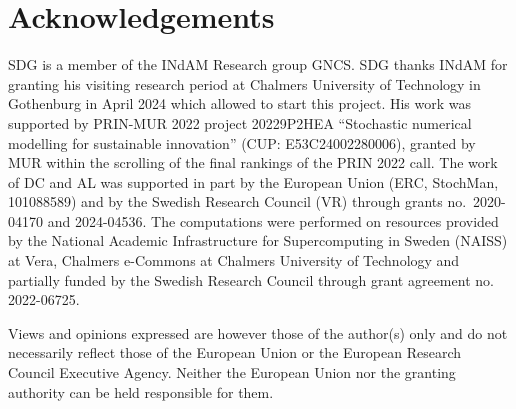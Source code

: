\documentclass[a4paper]{amsart}
\theoremstyle{remark}
\theoremstyle{definition}
\begin{document}
%



\section{Acknowledgements}

SDG is a member of the INdAM Research group GNCS. SDG thanks INdAM for granting his visiting research period at Chalmers University of Technology in Gothenburg in April 2024 which allowed to start this project. His work was supported by PRIN-MUR 2022 project 20229P2HEA ``Stochastic numerical modelling for sustainable innovation'' (CUP: E53C24002280006), granted by MUR
within the scrolling of the final rankings of the PRIN 2022 call. The work of DC and AL was supported in part by the European Union (ERC, StochMan, 101088589) and by the Swedish Research Council (VR) through grants no.\ 2020-04170 and 2024-04536. The computations were performed on resources provided by the National Academic Infrastructure for Supercomputing in Sweden (NAISS) at Vera, Chalmers e-Commons at Chalmers University of Technology and partially funded by the Swedish Research Council through grant agreement no. 2022-06725.

Views and opinions expressed are however those of the author(s) only and do not necessarily reflect those of the European Union or the European Research Council Executive Agency. Neither the European Union nor the granting authority can be held responsible for them.
\end{document}
